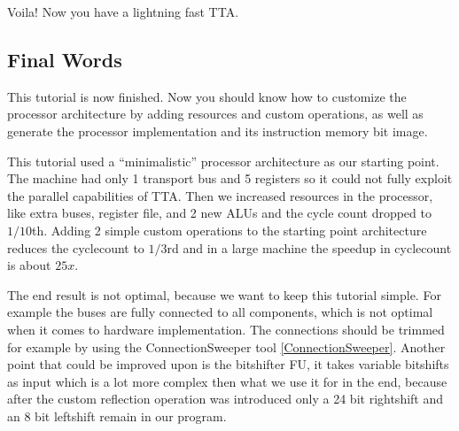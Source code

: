 \documentclass[twoside]{tceusermanual}
\begin{document}



Voila! Now you have a lightning fast TTA. %

\subsection{Final Words}

This tutorial is now finished. Now you should know how to customize
the processor architecture by adding resources and custom operations,
as well as generate the processor implementation and its instruction
memory bit image.

This tutorial used a ``minimalistic'' processor architecture as our
starting point. The machine had only 1 transport bus and 5 registers
so it could not fully exploit the parallel capabilities of TTA.  Then
we increased resources in the processor, like extra buses, register file,
and 2 new ALUs and the cycle count dropped to $1/10$th. 
Adding 2 simple custom operations to the starting point architecture 
reduces the cyclecount to $1/3$rd and in a large machine the speedup
in cyclecount is about $25x$.

The end result is not optimal, because we want to keep this tutorial simple. 
For example the buses are fully connected to all components, which is not optimal 
when it comes to hardware implementation. The connections should be trimmed 
for example by using the ConnectionSweeper tool \ref{ConnectionSweeper}. Another point that could be 
improved upon is the bitshifter FU, it takes variable bitshifts as input 
which is a lot more complex then what we use it for in the end, because after 
the custom reflection operation was introduced only a 24 bit rightshift and an 
8 bit leftshift remain in our program.

 
\end{document}
